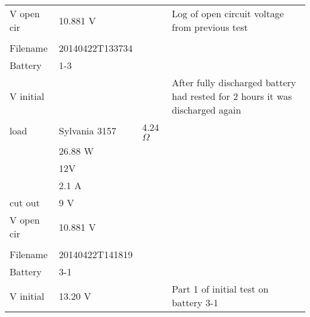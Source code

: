 \begin{longtable}{|l|l|l|p{2.5cm}|}
V open cir & 10.881 V                       &          & Log  of open circuit voltage from previous test                               \\
           &                                &          &                                                                               \\
Filename   & 20140422T133734                &          &                                                                               \\
Battery    & 1-3                            &          &                                                                               \\
V initial  &                                &          & After fully discharged battery had rested for 2 hours it was discharged again \\
load       & Sylvania 3157                  & 4.24 $\Omega$   &                                                                               \\
           & 26.88 W                        &          &                                                                               \\
           & 12V                            &          &                                                                               \\
           & 2.1 A                          &          &                                                                               \\
cut out    & 9 V                            &          &                                                                               \\
V open cir & 10.881 V                       &          &                                                                               \\
           &                                &          &                                                                               \\
\hline
Filename   & 20140422T141819                &          &                                                                               \\
Battery    & 3-1                            &          &                                                                               \\
V initial  & 13.20 V                        &          & Part 1 of initial test on battery 3-1                                         \\

\end{longtable}
